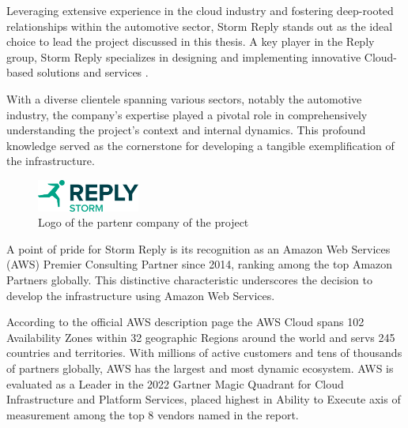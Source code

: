 Leveraging extensive experience in the cloud industry and fostering deep-rooted relationships within the automotive sector, Storm Reply stands out as the ideal choice to lead the project discussed in this thesis. A key player in the Reply group, Storm Reply specializes in designing and implementing innovative Cloud-based solutions and services \cite{StormReplySite}. 

With a diverse clientele spanning various sectors, notably the automotive industry, the company's expertise played a pivotal role in comprehensively understanding the project's context and internal dynamics. This profound knowledge served as the cornerstone for developing a tangible exemplification of the infrastructure.

\begin{figure}[h]  %
  \centering
  \includegraphics[width=0.3\textwidth]{images/Storm_Reply_logo.png}  %
  \caption{Logo of the partenr company of the project}
  \label{fig:StormReplyLogo}
\end{figure}

A point of pride for Storm Reply is its recognition as an Amazon Web Services (AWS) Premier Consulting Partner since 2014, ranking among the top Amazon Partners globally. This distinctive characteristic underscores the decision to develop the infrastructure using Amazon Web Services.

According to the official AWS description page \cite{AWSGlobalInfrastructure} the AWS Cloud spans 102 Availability Zones within 32 geographic Regions around the world and servs 245 countries and territories. With millions of active customers and tens of thousands of partners globally, AWS has the largest and most dynamic ecosystem. AWS is evaluated as a Leader in the 2022 Gartner Magic Quadrant for Cloud Infrastructure and Platform Services, placed highest in Ability to Execute axis of measurement among the top 8 vendors named in the report.

